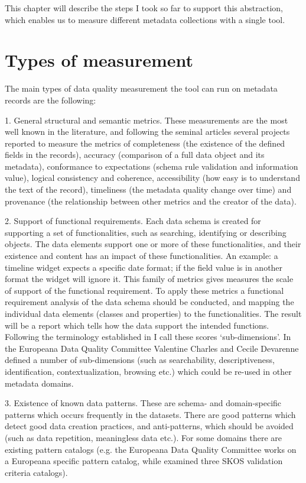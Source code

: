 This chapter will describe the steps I took so far to support this abstraction, which enables us to measure different metadata collections with a single tool.

\section{Types of measurement}

The main types of data quality measurement the tool can run on metadata records are the following:

1. General structural and semantic metrics. These measurements are the most well known in the literature, and following the seminal articles \cite{bruce-hillmann2004, ochoa-duval2009} several projects reported to measure
the metrics of completeness (the existence of the defined fields in the records), accuracy (comparison of a full data object and its metadata), conformance to expectations (schema rule validation and information value), logical consistency and coherence, accessibility (how easy is to understand the text of the record), timeliness (the metadata quality change over time) and provenance (the relationship between other metrics and the creator of the data).

2. Support of functional requirements. Each data schema is created for supporting a set of functionalities, such as searching, identifying or describing objects. The data elements support one or more of these functionalities, and their existence and content has an impact of these functionalities. An example: a timeline widget expects a specific date format; if the field value is in another format the widget will ignore it. This family of metrics gives measures the scale of support of the functional requirement. To apply these metrics a functional requirement analysis of the data schema should be conducted, and mapping the individual data elements (classes and properties) to the functionalities. The result will be a report which tells how the data support the intended functions. Following the terminology established in \cite{gavrilis2015} I call these scores `sub-dimensions'. In the Europeana Data Quality Committee Valentine Charles and Cecile Devarenne defined a number of sub-dimensions (such as searchability, descriptiveness, identification, contextualization, browsing etc.) which could be re-used in other metadata domains.

3. Existence of known data patterns. These are schema- and domain-specific patterns which occurs frequently in the datasets. There are good patterns which detect good data creation practices, and anti-patterns, which should be avoided (such as data repetition, meaningless data etc.). For some domains there are existing pattern catalogs (e.g. the Europeana Data Quality Committee works on a Europeana specific pattern catalog, while \cite{suominen2012} examined three SKOS validation criteria catalogs).

